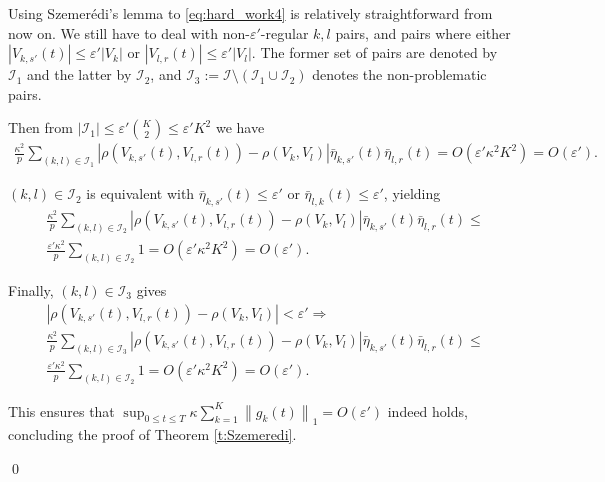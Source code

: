\documentclass{article}
\newcommand{\1}[1]{{\mathds{1}}_{\left\{#1\right\}}}
\begin{document}
	Using Szemer\'edi's lemma to \eqref{eq:hard_work4} is relatively straightforward from now on. We still have to deal with non-$\varepsilon'$-regular $k,l$ pairs, and pairs where either $\left|V_{k,s'}(t) \right| \leq \varepsilon' \left|V_k \right|$ or $\left|V_{l,r}(t) \right| \leq \varepsilon' \left|V_l \right|$. The former set of pairs are denoted by $\mathcal{I}_1$ and the latter by $\mathcal{I}_2$, and $\mathcal{I}_3:=\mathcal{I}\setminus \left(\mathcal{I}_1 \cup \mathcal{I}_2\right)$ denotes the non-problematic pairs.
	
	Then from $\left|\mathcal{I}_1 \right| \leq \varepsilon' {K \choose 2} \leq \varepsilon' K^2$ we have
	\begin{align*}
		\frac{\kappa^2}{p} \sum_{(k,l) \in \mathcal{I}_1} \left| \rho\left(V_{k,s'}(t),V_{l,r}(t)\right)-\rho\left(V_{k},V_{l}\right)  \right| \bar{\eta}_{k,s'}(t)\bar{\eta}_{l,r}(t)=O \left(\varepsilon'\kappa^2 K^2 \right)=O\left(\varepsilon'\right).
	\end{align*}
	
	$(k,l) \in \mathcal{I}_2$ is equivalent with $\bar{\eta}_{k,s'}(t) \leq \varepsilon'$ or $\bar{\eta}_{l,k}(t) \leq \varepsilon'$, yielding
	\begin{align*}
		& \frac{\kappa^2}{p} \sum_{(k,l) \in \mathcal{I}_2} \left| \rho\left(V_{k,s'}(t),V_{l,r}(t)\right)-\rho\left(V_{k},V_{l}\right)  \right| \bar{\eta}_{k,s'}(t)\bar{\eta}_{l,r}(t)\leq \\
		& \frac{\varepsilon' \kappa^2}{p} \sum_{(k,l) \in \mathcal{I}_2} 1=O \left(\varepsilon' \kappa^2 K^2\right)=O\left(\varepsilon'\right).
	\end{align*}
	
	Finally, $(k,l) \in \mathcal{I}_{3}$ gives
	\begin{align*}
		& \left| \rho\left(V_{k,s'}(t),V_{l,r}(t)\right)-\rho\left(V_{k},V_{l}\right)  \right| < \varepsilon' \Rightarrow \\
		& \frac{\kappa^2}{p} \sum_{(k,l) \in \mathcal{I}_3} \left| \rho\left(V_{k,s'}(t),V_{l,r}(t)\right)-\rho\left(V_{k},V_{l}\right)  \right| \bar{\eta}_{k,s'}(t)\bar{\eta}_{l,r}(t)\leq \\
		& \frac{\varepsilon' \kappa^2}{p} \sum_{(k,l) \in \mathcal{I}_2} 1 =O \left(\varepsilon' \kappa^2 K^2\right)=O\left(\varepsilon'\right).
	\end{align*}
	
	
	This ensures that $\sup_{0 \leq t \leq T} \kappa \sum_{k=1}^{K} \left \|g_k(t) \right \|_1=O\left( \varepsilon' \right)$ indeed holds, concluding the proof of Theorem \ref{t:Szemeredi}.
	
	\qed
	
	
	
	
	
\end{document}
